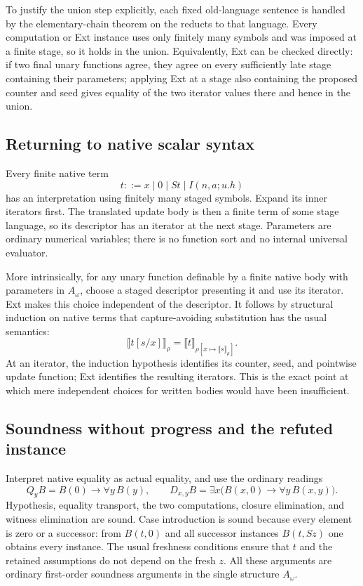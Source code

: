 To justify the union step explicitly, each fixed old-language sentence is
handled by the elementary-chain theorem on the reducts to that language.
Every computation or Ext instance uses only finitely many symbols and was
imposed at a finite stage, so it holds in the union. Equivalently, Ext can
be checked directly: if two final unary functions agree, they agree on
every sufficiently late stage containing their parameters; applying Ext at
a stage also containing the proposed counter and seed gives equality of
the two iterator values there and hence in the union.

\subsection{Returning to native scalar syntax}

Every finite native term
\[
 t::=x\mid0\mid St\mid I(n,a;u.h)
\]
has an interpretation using finitely many staged symbols. Expand its inner
iterators first. The translated update body is then a finite term of some
stage language, so its descriptor has an iterator at the next stage.
Parameters are ordinary numerical variables; there is no function sort and
no internal universal evaluator.

More intrinsically, for any unary function definable by a finite native
body with parameters in $A_\omega$, choose a staged descriptor presenting
it and use its iterator. Ext makes this choice independent of the
descriptor. It follows by structural induction on native terms that
capture-avoiding substitution has the usual semantics:
\[
 \llbracket t[s/x]\rrbracket_\rho
 =\llbracket t\rrbracket_{\rho[x\mapsto\llbracket s\rrbracket_\rho]}.
\]
At an iterator, the induction hypothesis identifies its counter, seed, and
pointwise update function; Ext identifies the resulting iterators. This is
the exact point at which mere independent choices for written bodies would
have been insufficient.

\subsection{Soundness without progress and the refuted instance}

Interpret native equality as actual equality, and use the ordinary readings
\[
 Q_y B=B(0)\to\forall y\,B(y),\qquad
 D_{x,y}B=\exists x\bigl(B(x,0)\to\forall y\,B(x,y)\bigr).
\]
Hypothesis, equality transport, the two computations, closure elimination,
and witness elimination are sound. Case introduction is sound because every
element is zero or a successor: from $B(t,0)$ and all successor instances
$B(t,Sz)$ one obtains every instance. The usual freshness conditions ensure
that $t$ and the retained assumptions do not depend on the fresh $z$.
All these arguments are ordinary first-order soundness arguments in the
single structure $A_\omega$.

